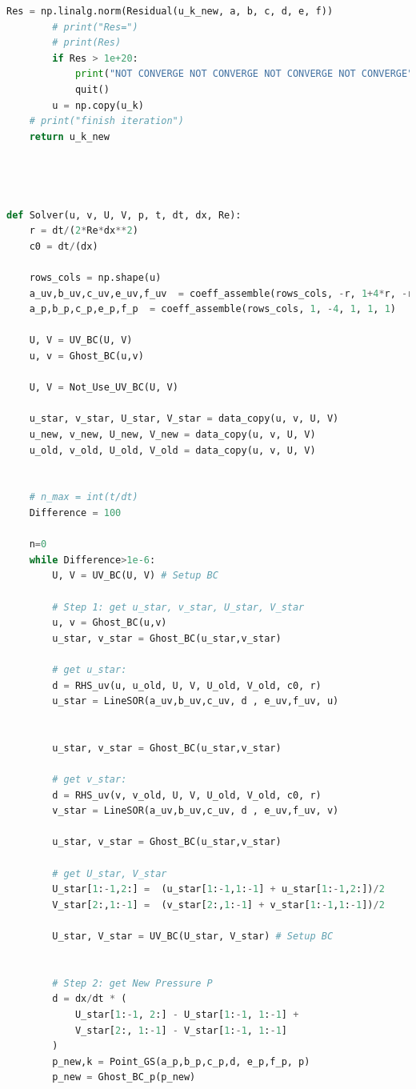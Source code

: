 \documentclass[12pt]{article}
\begin{document}
\begin{scriptsize}
\begin{lstlisting}[language=python,caption={Lid Driven Cavity Solver}]
        Res = np.linalg.norm(Residual(u_k_new, a, b, c, d, e, f))
        # print("Res=")
        # print(Res) 
        if Res > 1e+20: 
            print("NOT CONVERGE NOT CONVERGE NOT CONVERGE NOT CONVERGE") 
            quit()
        u = np.copy(u_k)
    # print("finish iteration")
    return u_k_new




def Solver(u, v, U, V, p, t, dt, dx, Re):
    r = dt/(2*Re*dx**2)
    c0 = dt/(dx)
    
    rows_cols = np.shape(u)
    a_uv,b_uv,c_uv,e_uv,f_uv  = coeff_assemble(rows_cols, -r, 1+4*r, -r, -r, -r)
    a_p,b_p,c_p,e_p,f_p  = coeff_assemble(rows_cols, 1, -4, 1, 1, 1)

    U, V = UV_BC(U, V)
    u, v = Ghost_BC(u,v)

    U, V = Not_Use_UV_BC(U, V) 

    u_star, v_star, U_star, V_star = data_copy(u, v, U, V) 
    u_new, v_new, U_new, V_new = data_copy(u, v, U, V) 
    u_old, v_old, U_old, V_old = data_copy(u, v, U, V)


    # n_max = int(t/dt)
    Difference = 100

    n=0
    while Difference>1e-6:
        U, V = UV_BC(U, V) # Setup BC

        # Step 1: get u_star, v_star, U_star, V_star
        u, v = Ghost_BC(u,v)
        u_star, v_star = Ghost_BC(u_star,v_star)

        # get u_star:    
        d = RHS_uv(u, u_old, U, V, U_old, V_old, c0, r)
        u_star = LineSOR(a_uv,b_uv,c_uv, d , e_uv,f_uv, u)


        u_star, v_star = Ghost_BC(u_star,v_star)

        # get v_star:
        d = RHS_uv(v, v_old, U, V, U_old, V_old, c0, r) 
        v_star = LineSOR(a_uv,b_uv,c_uv, d , e_uv,f_uv, v)

        u_star, v_star = Ghost_BC(u_star,v_star)

        # get U_star, V_star
        U_star[1:-1,2:] =  (u_star[1:-1,1:-1] + u_star[1:-1,2:])/2
        V_star[2:,1:-1] =  (v_star[2:,1:-1] + v_star[1:-1,1:-1])/2

        U_star, V_star = UV_BC(U_star, V_star) # Setup BC


        # Step 2: get New Pressure P
        d = dx/dt * (
            U_star[1:-1, 2:] - U_star[1:-1, 1:-1] +
            V_star[2:, 1:-1] - V_star[1:-1, 1:-1]
        )
        p_new,k = Point_GS(a_p,b_p,c_p,d, e_p,f_p, p)
        p_new = Ghost_BC_p(p_new)



\end{lstlisting}
\end{scriptsize}
\end{document}
